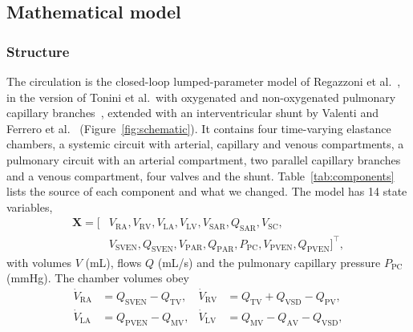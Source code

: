 \FloatBarrier
\subsection{Mathematical model}
\label{sec:model}

\subsubsection{Structure}
The circulation is the closed-loop lumped-parameter model of Regazzoni et al.~\cite{Regazzoni2022}, in the version of Tonini et al.\ with oxygenated and non-oxygenated pulmonary capillary branches~\cite{Tonini2024,Tonini2025}, extended with an interventricular shunt by Valenti and Ferrero et al.~\cite{Valenti2023,Ferrero2026Shunts} (Figure~\ref{fig:schematic}). It contains four time-varying elastance chambers, a systemic circuit with arterial, capillary and venous compartments, a pulmonary circuit with an arterial compartment, two parallel capillary branches and a venous compartment, four valves and the shunt. Table~\ref{tab:components} lists the source of each component and what we changed. The model has 14 state variables,
\begin{equation}
\begin{split}\mathbf{X} = \big[ & V_{\mathrm{RA}}, V_{\mathrm{RV}}, V_{\mathrm{LA}}, V_{\mathrm{LV}}, V_{\mathrm{SAR}}, Q_{\mathrm{SAR}}, V_{\mathrm{SC}}, \\
  & V_{\mathrm{SVEN}}, Q_{\mathrm{SVEN}}, V_{\mathrm{PAR}}, Q_{\mathrm{PAR}}, P_{\mathrm{PC}}, V_{\mathrm{PVEN}}, Q_{\mathrm{PVEN}} \big]^{\top},\end{split}
\label{eq:state}
\end{equation}
with volumes $V$ (mL), flows $Q$ (mL/s) and the pulmonary capillary pressure $P_{\mathrm{PC}}$ (mmHg). The chamber volumes obey
\begin{equation}
\begin{aligned}
\dot{V}_{\mathrm{RA}} &= Q_{\mathrm{SVEN}} - Q_{\mathrm{TV}}, &
\dot{V}_{\mathrm{RV}} &= Q_{\mathrm{TV}} + Q_{\mathrm{VSD}} - Q_{\mathrm{PV}}, \\
\dot{V}_{\mathrm{LA}} &= Q_{\mathrm{PVEN}} - Q_{\mathrm{MV}}, &
\dot{V}_{\mathrm{LV}} &= Q_{\mathrm{MV}} - Q_{\mathrm{AV}} - Q_{\mathrm{VSD}},
\end{aligned}
\label{eq:chambers}
\end{equation}
